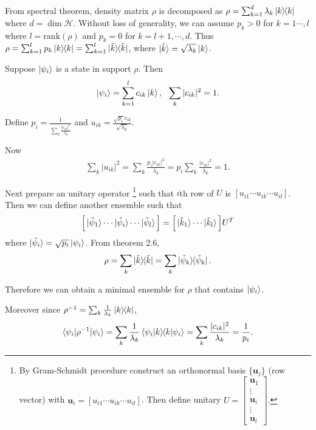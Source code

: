 From spectral theorem, density matrix $\rho$ is decomposed as $\rho = \sum_{k=1}^{d} \lambda_k \ket{k}\hspace{-1mm} \bra{k}$ where $d = \dim \mathcal{H}$.
Without loss of generality, we can assume $p_k > 0$ for $k = 1 \cdots , l$ where $l = \mathrm{rank} (\rho)$ and $p_k = 0$ for $k = l+1, \cdots, d$.
Thus $\rho = \sum_{k=1}^{l} p_k \ket{k}\hspace{-1mm} \bra{k} = \sum_{k=1}^{l} \ket{\tilde{k}}\hspace{-1mm} \bra{\tilde{k}}$, where $\ket{\tilde{k}} = \sqrt{\lambda_k} \ket{k}$.

Suppose $\ket{\psi_i}$ is a state in support $\rho$. Then
\begin{align*}
	\ket{\psi_i} = \sum_{k=1}^l c_{ik} \ket{k}, ~~ \sum_k |c_{ik}|^2 = 1.
\end{align*}

Define $\displaystyle p_i = \frac{1}{\sum_k \frac{|c_{ik}|^2}{\lambda_k} }$ and $\displaystyle u_{ik} = \frac{\sqrt{p_i} c_{ik}}{\sqrt{\lambda_k}}$.

Now
\begin{align*}
	\sum_k |u_{ik}|^2 = \sum_k \frac{p_i | c_{ik} |^2 }{\lambda_k} = p_i \sum_k \frac{| c_{ik} |^2 }{\lambda_k} = 1.
\end{align*}

Next prepare an unitary operator
\footnote{By Gram-Schmidt procedure construct an orthonormal basis $\{\boldsymbol{u}_j\}$ (row vector) with $\boldsymbol{u}_i = [u_{i1} \cdots u_{ik} \cdots u_{il}]$. Then define unitary $U = \begin{bmatrix}
    \boldsymbol{u}_1 \\ 
    \vdots \\ 
    \boldsymbol{u}_i \\ 
    \vdots \\ 
    \boldsymbol{u}_l
    \end{bmatrix}$.}
such that $i$th row of $U$ is $[u_{i1} \cdots u_{ik} \cdots u_{il}]$.
Then we can define another ensemble such that
\begin{align*}
	\Big[  \ket{\tilde{\psi}_1} \cdots  \ket{\tilde{\psi}_i} \cdots \ket{\tilde{\psi}_l}\Big] = \Big[ \ket{\tilde{k}_1} \cdots \ket{\tilde{k}_l} \Big] U^T
\end{align*}
where $\ket{\tilde{\psi_i}} = \sqrt{p_i} \ket{\psi_i}$.
From theorem 2.6,
\begin{align*}
	\rho = \sum_k \ket{\tilde{k}}\hspace{-1mm} \bra{\tilde{k}} = \sum_k \ket{\tilde{\psi}_k}\hspace{-1mm} \bra{\tilde{\psi}_k}.
\end{align*}

Therefore we can obtain a minimal ensemble for $\rho$ that contains $\ket{\psi_i}$.

Moreover since $\rho^{-1} = \sum_k \frac{1}{\lambda_k} \ket{k}\hspace{-1mm} \bra{k}$,
\begin{align*}
	\braket{\psi_i | \rho^{-1} | \psi_i} = \sum_k \frac{1}{\lambda_k} \braket{\psi_i | k} \hspace{-1mm} \braket{k | \psi_i} = \sum_k \frac{|c_{ik}|^2}{\lambda_k} = \frac{1}{p_i}.
\end{align*}

